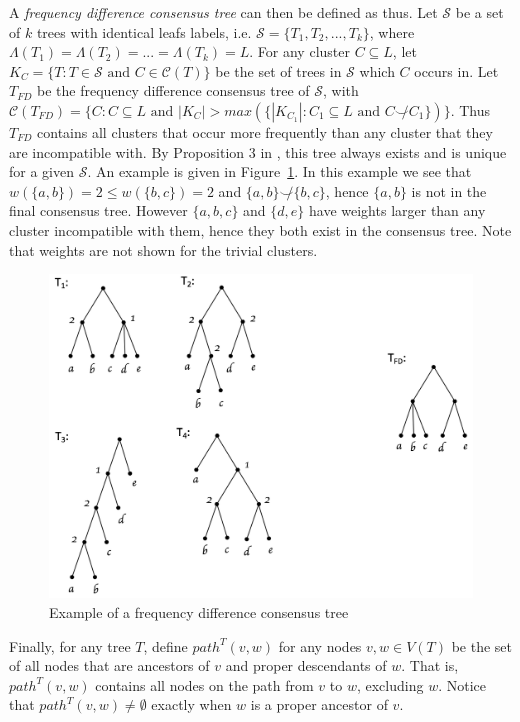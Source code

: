 \documentclass{article}
\newcommand{\compatible}{\smile}
\newcommand{\leafset}{\Lambda}
\begin{document}
    A \textit{frequency difference consensus tree} can then be defined as thus. Let $\mathcal{S}$ be a set of $k$ trees with identical leafs labels, i.e. $\mathcal{S} = \{T_1, T_2, ..., T_k\}$, where $\leafset(T_1) = \leafset(T_2) = ... = \leafset(T_k) = L$. For any cluster $C \subseteq L$, let $K_C = \{T : T \in \mathcal{S} \text{ and } C \in \mathcal{C}(T)\}$ be the set of trees in $\mathcal{S}$ which $C$ occurs in. Let $T_{FD}$ be the frequency difference consensus tree of $\mathcal{S}$, with $\mathcal{C}(T_{FD}) = \{C : C \subseteq L \text{ and } |K_C| > max(\{|K_{C_1}| : C_1 \subseteq L \text{ and } C \not\compatible C_1\})\}$. Thus $T_{FD}$ contains all clusters that occur more frequently than any cluster that they are incompatible with. By Proposition $3$ in \cite{steel2014axiomatic}, this tree always exists and is unique for a given $\mathcal{S}$. An example is given in Figure~\ref{fig:freqdiff}. In this example we see that $w(\{a, b\}) = 2 \leq w(\{b, c\}) = 2$ and $\{a, b\} \not\compatible \{b, c\}$, hence $\{a, b\}$ is not in the final consensus tree. However $\{a, b, c\}$ and $\{d, e\}$ have weights larger than any cluster incompatible with them, hence they both exist in the consensus tree. Note that weights are not shown for the trivial clusters.

    \begin{figure}[h]
        \includegraphics[scale=0.5]{freqdiff}
        \centering
        \caption{Example of a frequency difference consensus tree}
        \label{fig:freqdiff}
    \end{figure}

    Finally, for any tree $T$, define $path^{T}(v, w)$ for any nodes $v, w \in V(T)$ be the set of all nodes that are ancestors of $v$ and proper descendants of $w$. That is, $path^{T}(v, w)$ contains all nodes on the path from $v$ to $w$, excluding $w$. Notice that $path^{T}(v, w) \neq \emptyset$ exactly when $w$ is a proper ancestor of $v$.
\end{document}
